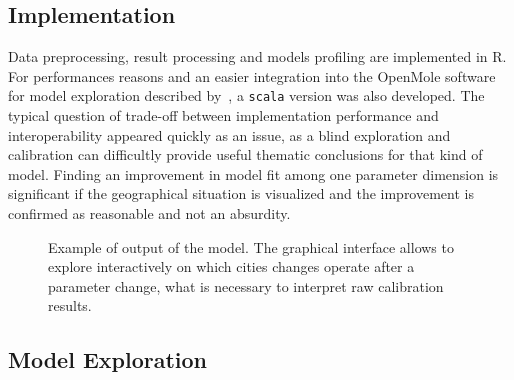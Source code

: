 \documentclass[Royal,sageh,times]{sagej}
\begin{document}
\subsection{Implementation}

Data preprocessing, result processing and models profiling are implemented in R. For performances reasons and an easier integration into the OpenMole software for model exploration described by~\cite{reuillon2013openmole}, a \texttt{scala} version was also developed. The typical question of trade-off between implementation performance and interoperability appeared quickly as an issue, as a blind exploration and calibration can difficultly provide useful thematic conclusions for that kind of model. Finding an improvement in model fit among one parameter dimension is significant if the geographical situation is visualized and the improvement is confirmed as reasonable and not an absurdity.


\begin{figure}
\centering
\caption{Example of output of the model. The graphical interface allows to explore interactively on which cities changes operate after a parameter change, what is necessary to interpret raw calibration results.}
\end{figure}




\subsection{Model Exploration}

\end{document}
